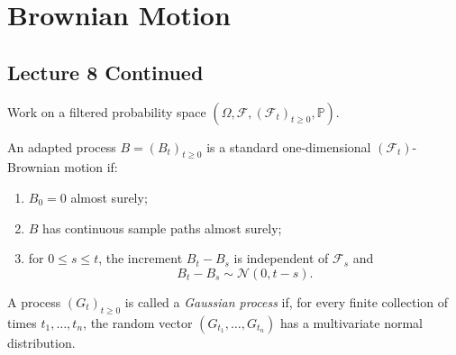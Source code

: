 \chapter{Brownian Motion}
\section{Lecture 8 Continued}

Work on a filtered probability space
$(\Omega,\mathcal{F},(\mathcal{F}_t)_{t\ge0},\mathbb{P})$.

\begin{definition}
An adapted process $B=(B_t)_{t\ge0}$ is a standard one-dimensional
$(\mathcal{F}_t)$-Brownian motion if:
\begin{enumerate}
 \item $B_0=0$ almost surely;
 \item $B$ has continuous sample paths almost surely;
 \item for $0\le s\le t$, the increment $B_t-B_s$ is independent of
 $\mathcal{F}_s$ and
 \[
 B_t-B_s\sim\mathcal{N}(0,t-s).
 \]
\end{enumerate}
\end{definition}

\begin{definition}
A process $(G_t)_{t\ge0}$ is called a \emph{Gaussian process} if, for every
finite collection of times $t_1,\ldots,t_n$, the random vector
$(G_{t_1},\ldots,G_{t_n})$ has a multivariate normal distribution.
\end{definition}

